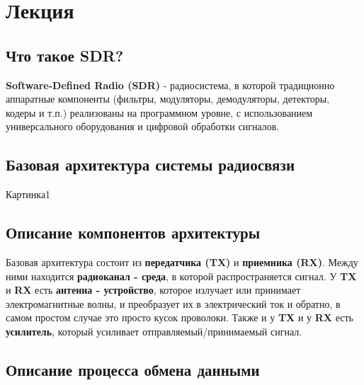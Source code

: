 \chapter{Лекция}
\label{ch:intro}

\section*{Что такое SDR?}

\textbf{Software-Defined Radio (SDR)} - радиосистема, в которой 
традиционно аппаратные компоненты (фильтры, модуляторы, демодуляторы, детекторы, кодеры и т.п.) 
реализованы на программном уровне, с использованием универсального оборудования и цифровой обработки сигналов.

\section*{Базовая архитектура системы радиосвязи}

Картинка1 \\

\section*{Описание компонентов архитектуры}

Базовая архитектура состоит из \textbf{передатчика (TX)} и \textbf{приемника (RX)}. Между ними находится \textbf{радиоканал - среда}, в которой распространяется сигнал. У \textbf{TX} и \textbf{RX} есть \textbf{антенна - устройство}, которое излучает или принимает электромагнитные волны, и преобразует их в электрический ток и обратно, в самом простом случае это просто кусок проволоки. Также и у \textbf{TX} и у \textbf{RX} есть \textbf{усилитель}, который усиливает отправляемый/принимаемый сигнал.

\section*{Описание процесса обмена данными}

